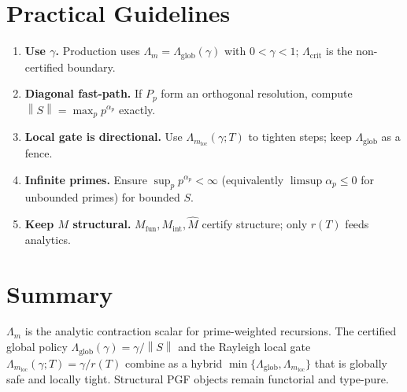 \documentclass[11pt]{article}
\theoremstyle{definition}
\newcommand{\Mfun}{M_{\mathrm{fun}}}
\newcommand{\Mint}{M_{\mathrm{int}}}
\newcommand{\Mhat}{\widehat{M}}
\newcommand{\Lcrit}{\Lambda_{\mathrm{crit}}}
\newcommand{\Lglob}{\Lambda_{\mathrm{glob}}}
\newcommand{\Lm}{\Lambda_m}
\newcommand{\norm}[1]{\left\lVert #1\right\rVert}
\begin{document}
\section{Practical Guidelines}
\begin{enumerate}[leftmargin=*,label=G\arabic*.]
\item \textbf{Use $\gamma$.} Production uses $\Lm=\Lglob(\gamma)$ with $0<\gamma<1$; $\Lcrit$ is the non-certified boundary.
\item \textbf{Diagonal fast-path.} If $P_p$ form an orthogonal resolution, compute $\norm{S}=\max_p p^{\alpha_p}$ exactly.
\item \textbf{Local gate is directional.} Use $\Lm_{\mathrm{loc}}(\gamma;T)$ to tighten steps; keep $\Lglob$ as a fence.
\item \textbf{Infinite primes.} Ensure $\sup_p p^{\alpha_p}<\infty$ (equivalently $\limsup \alpha_p\le 0$ for unbounded primes) for bounded $S$.
\item \textbf{Keep $M$ structural.} $\Mfun,\Mint,\Mhat$ certify structure; only $r(T)$ feeds analytics.
\end{enumerate}

\section*{Summary}
$\Lm$ is the analytic contraction scalar for prime-weighted recursions. The certified global policy $\Lglob(\gamma)=\gamma/\norm{S}$ and the Rayleigh local gate $\Lm_{\mathrm{loc}}(\gamma;T)=\gamma/r(T)$ combine as a hybrid $\min\{\Lglob,\Lm_{\mathrm{loc}}\}$ that is globally safe and locally tight. Structural PGF objects remain functorial and type-pure.

\nocite{*}


\end{document}
